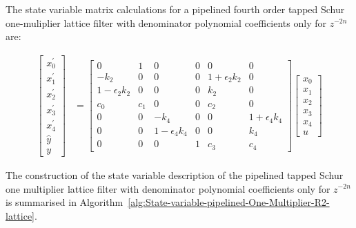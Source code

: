 \documentclass[a4paper,twoside,10pt,english]{article}
\begin{document}
The state variable matrix calculations for a pipelined fourth order tapped Schur
one-muliplier lattice filter with denominator polynomial coefficients only for
$z^{-2n}$ are:

\begin{align*}
  \left[\begin{array}{c}
    x_{0}^{\prime} \\
    x_{1}^{\prime} \\
    x_{2}^{\prime} \\
    x_{3}^{\prime} \\
    x_{4}^{\prime} \\
    \hat{y} \\
    y\end{array}\right] &= 
  \left[\begin{array}{cccccc} 0 & 1 & 0 & 0 & 0 & 0\\
    -k_{2} & 0 & 0 & 0 & 1+\epsilon_{2}k_{2} & 0\\
    1-\epsilon_{2}k_{2} & 0 & 0 & 0 & k_{2} & 0\\
    c_{0} & c_{1} & 0 & 0 & c_{2} & 0 \\
    0 & 0 & -k_{4} & 0 & 0 & 1+\epsilon_{4}k_{4}\\
    0 & 0 & 1-\epsilon_{4}k_{4}  & 0 & 0 & k_{4} \\
    0 & 0 & 0 & 1 & c_{3} & c_{4}\end{array}\right] \left[\begin{array}{c}
    x_{0} \\
    x_{1} \\
    x_{2} \\
    x_{3} \\
    x_{4} \\
    u \end{array} \right]
\end{align*}

The construction of the state variable description of the pipelined tapped Schur
one multiplier lattice filter with denominator polynomial coefficients only for
$z^{-2n}$ is summarised in
Algorithm~\ref{alg:State-variable-pipelined-One-Multiplier-R2-lattice}.
\end{document}
